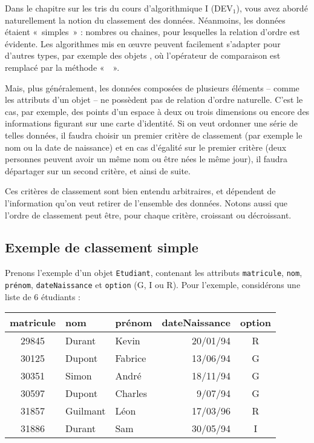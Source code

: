 	Dans le chapitre sur les tris du cours d'algorithmique I (DEV$_1$), 
	vous avez abordé naturellement la notion du classement des données. 
	Néanmoins, les données étaient «~simples~» : 
	nombres ou chaines, pour lesquelles la relation d’ordre est évidente. 
	Les algorithmes mis en œuvre peuvent facilement s’adapter pour d’autres types, 
	par exemple des objets , où l’opérateur de comparaison est remplacé par la méthode
	«~~».
	
	Mais, plus généralement, les données composées de plusieurs
	éléments -- comme les attributs d'un objet -- 
	ne possèdent pas de relation d’ordre naturelle. 
	C'est le cas, par exemple, des points d’un espace à deux ou trois dimensions
	ou encore des informations figurant sur une carte d’identité. 
	Si on veut ordonner une série de telles données, 
	il faudra choisir un premier critère de classement 
	(par exemple le nom ou la date de naissance) 
	et en cas d’égalité sur le premier critère 
	(deux personnes peuvent avoir un même nom ou être nées le même jour), 
	il faudra départager sur un second critère, 
	et ainsi de suite.
	
	Ces critères de classement sont bien entendu arbitraires, 
	et dépendent de l’information qu’on veut retirer de l’ensemble des données. 
	Notons aussi que l’ordre de classement peut être, pour chaque critère, 
	croissant ou décroissant.

\subsection*{Exemple de classement simple}

	Prenons l’exemple d’un objet \texttt{Etudiant}, 
	contenant les attributs \texttt{matricule}, \texttt{nom}, \texttt{prénom}, 
	\texttt{dateNaissance} et \texttt{option} (G, I ou R). 
	Pour l’exemple, considérons une liste de 6 étudiants :
	
	\begin{center}
	\small\sffamily
	\begin{tabular}{cllrc}
		matricule 	& nom 		& prénom 	& dateNaissance & option \\
		\hline 
		29845     	& Durant 	& Kevin 	& 20/01/94 		& R\\
		30125 		& Dupont	& Fabrice 	& 13/06/94 		& G\\
		30351 		& Simon 	& André 	& 18/11/94 		& G\\
		30597 		& Dupont 	& Charles 	& 9/07/94 		& G\\
		31857 		& Guilmant  & Léon 		& 17/03/96 		& R\\
		31886 		& Durant  	& Sam 		& 30/05/94 		& I\\
		\hline 
	\end{tabular}
	\end{center}
	
